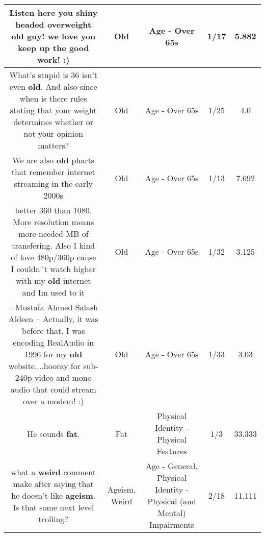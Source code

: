 \documentclass[11pt]{article}
\newlength\mylength
\begin{document}
\begin{center}
\begin{longtable}{|C{.65\mylength}|C{.30\mylength}|C{.12\mylength}|C{.12\mylength}|C{.12\mylength}|}
  \small Listen here you shiny headed overweight \textbf{old} guy! we love you keep up the good work! :)\normalsize   & Old & Age - Over 65s & 1/17 & 5.882 \\  \hline
  \small What's stupid is 36 isn't even \textbf{old}. And also since when is there rules stating that your weight determines whether or not your opinion matters?\normalsize   & Old & Age - Over 65s & 1/25 & 4.0 \\  \hline
  \small We are also \textbf{old} pharts that remember internet streaming in the early 2000s\normalsize   & Old & Age - Over 65s & 1/13 & 7.692 \\  \hline
  \small better 360 than 1080. More resolution means more needed MB of transfering. Also I kind of love 480p/360p cause I couldn´t watch higher with my \textbf{old} internet and Im used to it\normalsize   & Old & Age - Over 65s & 1/32 & 3.125 \\  \hline
  \small +Mustafa Ahmed Salash Aldeen -- Actually, it was before that.  I was encoding RealAudio in 1996 for my \textbf{old} website....hooray for sub-240p video and mono audio that could stream over a modem! :)\normalsize   & Old & Age - Over 65s & 1/33 & 3.03 \\  \hline
  \small He sounds \textbf{fat}.\normalsize   & Fat & Physical Identity - Physical Features & 1/3 & 33.333 \\  \hline
  \small what a \textbf{weird} comment make after saying that he doesn't like \textbf{ageism}. Is that some next level trolling?\normalsize   & Ageism, Weird & Age - General, Physical Identity - Physical (and Mental) Impairments & 2/18 & 11.111 \\  \hline

\end{longtable}
\end{center}
\end{document}
